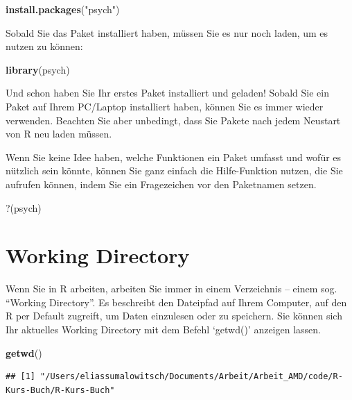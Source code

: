\documentclass[
  ngerman,
]{book}
\newenvironment{Shaded}{\begin{snugshade}}{\end{snugshade}}
\newcommand{\FunctionTok}[1]{\textcolor[rgb]{0.13,0.29,0.53}{\textbf{#1}}}
\newcommand{\NormalTok}[1]{#1}
\newcommand{\StringTok}[1]{\textcolor[rgb]{0.31,0.60,0.02}{#1}}
\begin{document}
\begin{Shaded}
\begin{Highlighting}[]
\FunctionTok{install.packages}\NormalTok{(}\StringTok{"psych"}\NormalTok{)}
\end{Highlighting}
\end{Shaded}

Sobald Sie das Paket installiert haben, müssen Sie es nur noch laden, um es nutzen zu können:

\begin{Shaded}
\begin{Highlighting}[]
\FunctionTok{library}\NormalTok{(psych)}
\end{Highlighting}
\end{Shaded}

Und schon haben Sie Ihr erstes Paket installiert und geladen! Sobald Sie ein Paket auf Ihrem PC/Laptop installiert haben, können Sie es immer wieder verwenden. Beachten Sie aber unbedingt, dass Sie Pakete nach jedem Neustart von R neu laden müssen.

Wenn Sie keine Idee haben, welche Funktionen ein Paket umfasst und wofür es nützlich sein könnte, können Sie ganz einfach die Hilfe-Funktion nutzen, die Sie aufrufen können, indem Sie ein Fragezeichen vor den Paketnamen setzen.

\begin{Shaded}
\begin{Highlighting}[]
\NormalTok{?(psych)}
\end{Highlighting}
\end{Shaded}

\section{Working Directory}\label{working-directory}

Wenn Sie in R arbeiten, arbeiten Sie immer in einem Verzeichnis -- einem sog. ``Working Directory''. Es beschreibt den Dateipfad auf Ihrem Computer, auf den R per Default zugreift, um Daten einzulesen oder zu speichern. Sie können sich Ihr aktuelles Working Directory mit dem Befehl `getwd()' anzeigen lassen.

\begin{Shaded}
\begin{Highlighting}[]
\FunctionTok{getwd}\NormalTok{()}
\end{Highlighting}
\end{Shaded}

\begin{verbatim}
## [1] "/Users/eliassumalowitsch/Documents/Arbeit/Arbeit_AMD/code/R-Kurs-Buch/R-Kurs-Buch"
\end{verbatim}
\end{document}
